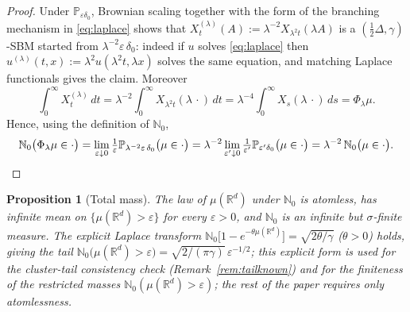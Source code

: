 \documentclass[11pt]{article}
\newtheorem{proposition}[theorem]{Proposition}
\theoremstyle{definition}
\theoremstyle{remark}
\newcommand{\R}{\mathbb{R}}
\newcommand{\bP}{\mathbb{P}}
\newcommand{\bN}{{\mathbb{N}_0}}                 %
\newcommand{\eps}{\varepsilon}
\numberwithin{equation}{section}
\theoremstyle{plain}
\theoremstyle{definition}
\theoremstyle{remark}
\theoremstyle{plain}
\begin{document}
\begin{proof}
Under $\bP_{\eps\delta_0}$, Brownian scaling together with the form of the
branching mechanism in \eqref{eq:laplace} shows that
$X^{(\lambda)}_t(A):=\lambda^{-2}X_{\lambda^2t}(\lambda A)$ is a
$(\frac12\Delta,\gamma)$-SBM started from $\lambda^{-2}\eps\,\delta_0$:
indeed if $u$ solves \eqref{eq:laplace} then
$u^{(\lambda)}(t,x):=\lambda^{2}u(\lambda^2t,\lambda x)$ solves the same
equation, and matching Laplace functionals gives the claim. Moreover
\[
\int_0^\infty X^{(\lambda)}_t\,dt
=\lambda^{-2}\int_0^\infty X_{\lambda^2 t}(\lambda\,\cdot)\,dt
=\lambda^{-4}\int_0^\infty X_{s}(\lambda\,\cdot)\,ds=\Phi_\lambda\mu .
\]
Hence, using the definition of $\bN$,
\[
\bN\bigl(\Phi_\lambda\mu\in\cdot\bigr)
=\lim_{\eps\downarrow0}\tfrac1\eps
\bP_{\lambda^{-2}\eps\,\delta_0}\bigl(\mu\in\cdot\bigr)
=\lambda^{-2}\lim_{\eps'\downarrow0}\tfrac1{\eps'}
\bP_{\eps'\delta_0}\bigl(\mu\in\cdot\bigr)
=\lambda^{-2}\,\bN\bigl(\mu\in\cdot\bigr). \qedhere
\]
\end{proof}

\begin{proposition}[Total mass]\label{prop:totalmass}
The law of $\mu(\R^d)$ under $\bN$ is atomless, has infinite mean on
$\{\mu(\R^d)>\eps\}$ for every $\eps>0$, and $\bN$ is an infinite but
$\sigma$-finite measure. The explicit Laplace transform
$\bN\bigl[1-e^{-\theta\mu(\R^d)}\bigr]=\sqrt{2\theta/\gamma}$
($\theta>0$) holds, giving the tail
$\bN\bigl(\mu(\R^d)>\eps\bigr)=\sqrt{2/(\pi\gamma)}\,\eps^{-1/2}$; this
explicit form is used for the cluster-tail consistency check
(Remark~\ref{rem:tailknown}) and for the finiteness of the restricted masses
$\bN(\mu(\R^d)>\eps)$; the rest of the paper requires only atomlessness.
\end{proposition}
\end{document}
